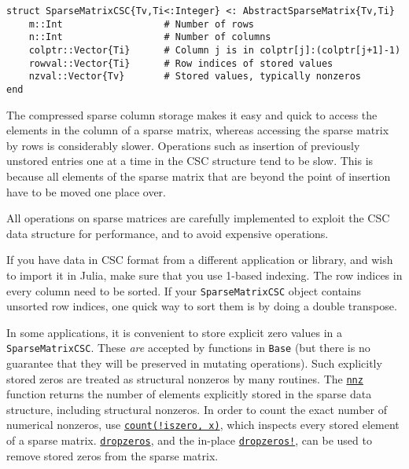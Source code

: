 \begin{verbatim}
struct SparseMatrixCSC{Tv,Ti<:Integer} <: AbstractSparseMatrix{Tv,Ti}
    m::Int                  # Number of rows
    n::Int                  # Number of columns
    colptr::Vector{Ti}      # Column j is in colptr[j]:(colptr[j+1]-1)
    rowval::Vector{Ti}      # Row indices of stored values
    nzval::Vector{Tv}       # Stored values, typically nonzeros
end
\end{verbatim}



The compressed sparse column storage makes it easy and quick to access the elements in the column of a sparse matrix, whereas accessing the sparse matrix by rows is considerably slower. Operations such as insertion of previously unstored entries one at a time in the CSC structure tend to be slow. This is because all elements of the sparse matrix that are beyond the point of insertion have to be moved one place over.



All operations on sparse matrices are carefully implemented to exploit the CSC data structure for performance, and to avoid expensive operations.



If you have data in CSC format from a different application or library, and wish to import it in Julia, make sure that you use 1-based indexing. The row indices in every column need to be sorted. If your \texttt{SparseMatrixCSC} object contains unsorted row indices, one quick way to sort them is by doing a double transpose.



In some applications, it is convenient to store explicit zero values in a \texttt{SparseMatrixCSC}. These \emph{are} accepted by functions in \texttt{Base} (but there is no guarantee that they will be preserved in mutating operations). Such explicitly stored zeros are treated as structural nonzeros by many routines. The \hyperlink{4231069364201374387}{\texttt{nnz}} function returns the number of elements explicitly stored in the sparse data structure, including structural nonzeros. In order to count the exact number of numerical nonzeros, use \hyperlink{4123799324867706690}{\texttt{count(!iszero, x)}}, which inspects every stored element of a sparse matrix. \hyperlink{10222793754853330762}{\texttt{dropzeros}}, and the in-place \hyperlink{13132808383029320263}{\texttt{dropzeros!}}, can be used to remove stored zeros from the sparse matrix.




